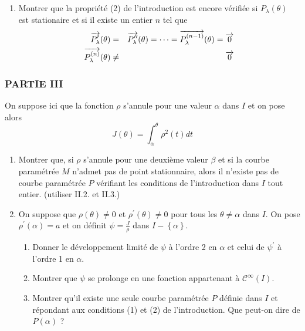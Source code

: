 \begin{enumerate}
\item  Montrer que la propri\'{e}t\'{e} (2) de l'introduction est encore
v\'{e}rifi\'{e}e si $P_{\lambda }(\theta )$ est stationaire et si il existe
un entier $n$ tel que 
\begin{eqnarray*}
\overrightarrow{P_{\lambda }^{\prime }}(\theta ) &=&\overrightarrow{%
P_{\lambda }^{\prime \prime }}(\theta )=\cdots =\overrightarrow{P_{\lambda
}^{(n-1)}}(\theta )=\overrightarrow{0} \\
\overrightarrow{P_{\lambda }^{(n)}}(\theta ) &\neq &\overrightarrow{0}
\end{eqnarray*}
\end{enumerate}

\subsubsection*{PARTIE III}

On suppose ici que la fonction $\rho $ s'annule pour une valeur $\alpha $
dans $I$ et on pose alors
\[
J(\theta )=\int_{\alpha }^{\theta }\rho ^{2}(t)dt
\]

\begin{enumerate}
\item  Montrer que, si $\rho $ s'annule pour une deuxi\`{e}me valeur $\beta $
et si la courbe param\'{e}tr\'{e}e $M$ n'admet pas de point stationnaire,
alors il n'existe pas de courbe param\'{e}tr\'{e}e $P$ v\'{e}rifiant les
conditions de l'introduction dans $I$ tout entier. (utiliser II.2. et II.3.)

\item  On suppose que $\rho (\theta )\neq 0$ et $\rho ^{\prime }(\theta
)\neq 0$ pour tous les $\theta \neq \alpha $ dans $I$. On pose $\rho
^{\prime }(\alpha )=a$ et on d\'{e}finit $\psi =\frac{J}{\rho }$ dans $%
I-\left\{ \alpha \right\} $.

\begin{enumerate}
\item  Donner le d\'{e}veloppement limit\'{e} de $\psi $ \`{a} l'ordre 2 en $%
\alpha $ et celui de $\psi ^{\prime }$ \`{a} l'ordre 1 en $\alpha $.

\item  Montrer que $\psi $ se prolonge en une fonction appartenant \`{a} $%
\mathcal{C}^{\infty }(I)$.

\item  Montrer qu'il existe une seule courbe param\'{e}tr\'{e}e $P$
d\'{e}finie dans $I$ et r\'{e}pondant aux conditions (1) et (2) de
l'introduction. Que peut-on dire de $P(\alpha )$ ?
\end{enumerate}
\end{enumerate}

